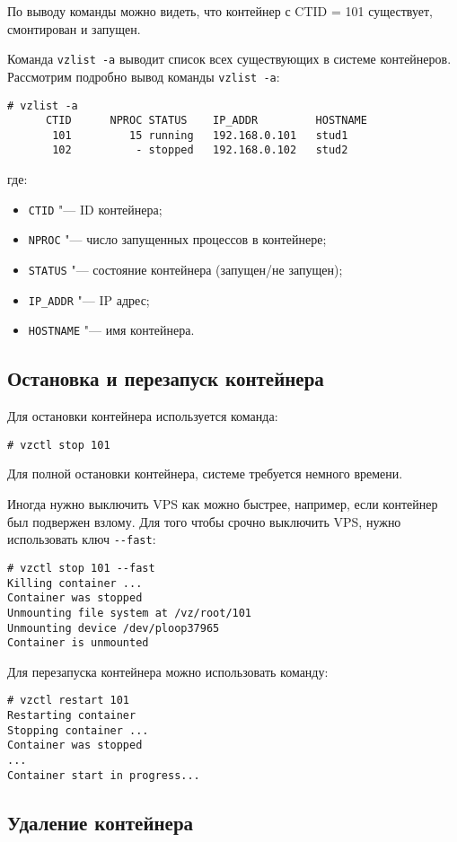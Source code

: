 По выводу команды можно видеть, что контейнер с CTID = 101 существует, смонтирован и запущен.

Команда \texttt{vzlist -a} выводит список всех существующих в системе контейнеров.
Рассмотрим подробно вывод команды \texttt{vzlist -a}:
\begin{lstlisting}
# vzlist -a
      CTID      NPROC STATUS    IP_ADDR         HOSTNAME
       101         15 running   192.168.0.101   stud1
       102          - stopped   192.168.0.102   stud2
\end{lstlisting}
где:
\begin{itemize}
    \item \texttt{CTID} "--- ID контейнера;
    \item \texttt{NPROC} "--- число запущенных процессов в контейнере;
    \item \texttt{STATUS} "--- состояние контейнера (запущен/не запущен);
    \item \texttt{IP\_ADDR} "--- IP адрес;
    \item \texttt{HOSTNAME} "--- имя контейнера.
\end{itemize}

\subsection{Остановка и перезапуск контейнера}
Для остановки контейнера используется команда:
\begin{lstlisting}
# vzctl stop 101
\end{lstlisting}

Для полной остановки контейнера, системе требуется немного времени.

Иногда нужно выключить VPS как можно быстрее, например, если контейнер был подвержен взлому.
Для того чтобы срочно выключить VPS, нужно использовать ключ \texttt{-{}-fast}:
\begin{lstlisting}
# vzctl stop 101 --fast
Killing container ...
Container was stopped
Unmounting file system at /vz/root/101
Unmounting device /dev/ploop37965
Container is unmounted
\end{lstlisting}

Для перезапуска контейнера можно использовать команду:
\begin{lstlisting}
# vzctl restart 101
Restarting container
Stopping container ...
Container was stopped
...
Container start in progress...
\end{lstlisting}

\subsection{Удаление контейнера}

